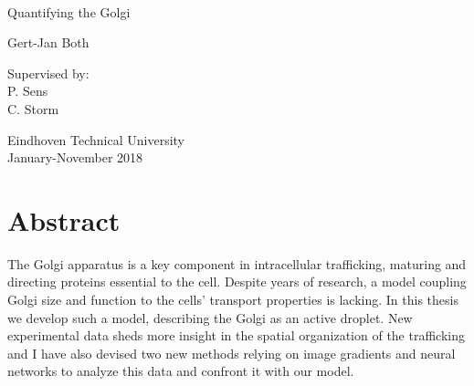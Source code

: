 \documentclass{Dissertate}
\date{}
\begin{document}
\begin{titlepage}
​    \begin{center}

        
        \vspace*{2.5cm}
        
        \huge
        Quantifying the Golgi
        
        \vspace{1.5cm}
        
        \Large
        Gert-Jan Both
    
        \vspace{1.5cm}
    
        
        \vfill
        
        \normalsize
        Supervised by:\\
        P. Sens\\
        C. Storm
    
        \vspace{0.8cm}
    
        
        \normalsize
        Eindhoven Technical University\\
        January-November 2018
    
    
    \end{center}
\end{titlepage}

\hypertarget{abstract}{%
\chapter*{Abstract}\label{abstract}}
 The Golgi apparatus is a key component in intracellular
trafficking, maturing and directing proteins essential to the cell.
Despite years of research, a model coupling Golgi size and function to
the cells' transport properties is lacking. In this thesis we develop
such a model, describing the Golgi as an active droplet. New
experimental data sheds more insight in the spatial organization of the
trafficking and I have also devised two new methods relying on image
gradients and neural networks to analyze this data and confront it with
our model.
\end{document}
